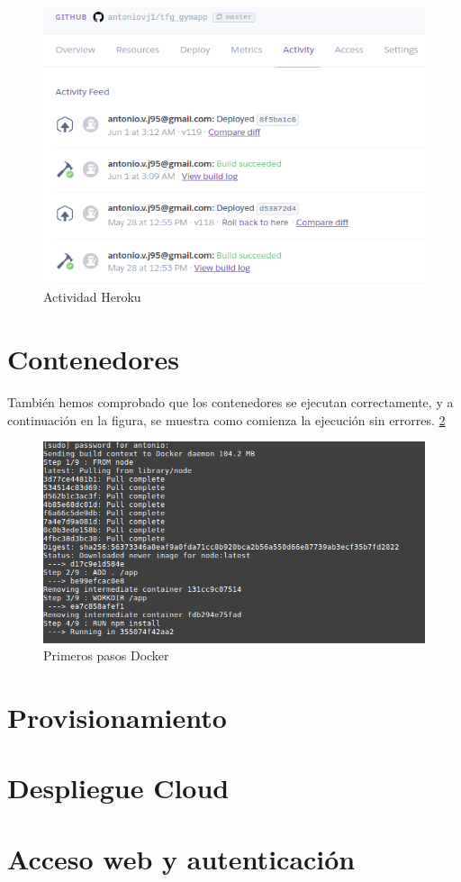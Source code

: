 \begin{figure}
  \begin{center}
    \includegraphics[width=\textwidth]{imagenes/heroku.png}
    \caption{Actividad Heroku}
    \label{fig:heroku}
  \end{center}
\end{figure}

\section {Contenedores}
También hemos comprobado que los contenedores se ejecutan correctamente, y a continuación en la figura, se muestra como comienza la ejecución sin errorres. \ref{fig:docker}
\begin{figure}
  \begin{center}
    \includegraphics[width=\textwidth]{imagenes/docker.png}
    \caption{Primeros pasos Docker}
    \label{fig:docker}
  \end{center}
\end{figure}

\section {Provisionamiento}
\section {Despliegue Cloud}
\section {Acceso web y autenticación}
